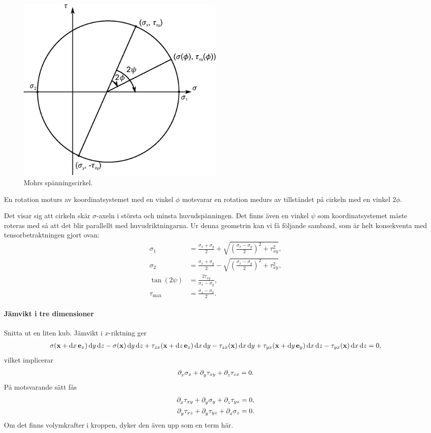 \begin{figure}[!ht]
	\centering
	\includegraphics[width = 0.5\textwidth]{./Images/mohr_stress_circle.eps}
	\caption{Mohrs spänningscirkel.}
	\label{fig:mohr_stress_circle}
\end{figure}

En rotation moturs av koordinatsystemet med en vinkel $\phi$ motsvarar en rotation medurs av tillståndet på cirkeln med en vinkel $2\phi$.

Det visar sig att cirkeln skär $\sigma$-axeln i största och minsta huvudspänningen. Det finns även en vinkel $\psi$ som koordinatsystemet måste roteras med så att det blir parallellt med huvudriktningarna. Ur denna geometrin kan vi få följande samband, som är helt konsekventa med tensorbetraktningen gjort ovan:
\begin{align*}
	\sigma_{1}        &= \frac{\sigma_{x} + \sigma_{y}}{2} + \sqrt{\left(\frac{\sigma_{x} - \sigma_{y}}{2}\right)^{2} + \tau_{xy}^{2}}, \\
	\sigma_{2}        &= \frac{\sigma_{x} + \sigma_{y}}{2} - \sqrt{\left(\frac{\sigma_{x} - \sigma_{y}}{2}\right)^{2} + \tau_{xy}^{2}}, \\
	\tan(2\psi)       &= \frac{2\tau_{xy}}{\sigma_{x} - \sigma_{y}}, \\
	\tau_{\text{max}} &= \frac{\sigma_{1} - \sigma_{3}}{2}.
\end{align*}

\paragraph{Jämvikt i tre dimensioner}
Snitta ut en liten kub. Jämvikt i $x$-riktning ger
\begin{align*}
	\sigma(\vb{x} + \dd{x}\vb{e}_{x})\dd{y}\dd{z} - \sigma(\vb{x})\dd{y}\dd{z} + \tau_{zx}(\vb{x} + \dd{z}\vb{e}_{z})\dd{x}\dd{y} - \tau_{zx}(\vb{x})\dd{x}\dd{y} + \tau_{yx}(\vb{x} + \dd{y}\vb{e}_{y})\dd{x}\dd{z} - \tau_{yx}(\vb{x})\dd{x}\dd{z} = 0,
\end{align*}
vilket implicerar
\begin{align*}
	\partial_{x}^{}\sigma_{x} + \partial_{y}^{}\tau_{xy} + \partial_{z}^{}\tau_{zx} = 0.
\end{align*}
På motsvarande sätt fås
\begin{align*}
	\partial_{x}^{}\tau_{xy} + \partial_{y}^{}\sigma_{y} + \partial_{z}^{}\tau_{yz} &= 0, \\
	\partial_{y}^{}\tau_{xz} + \partial_{y}^{}\tau_{yz} + \partial_{z}^{}\sigma_{z} &= 0.
\end{align*}
Om det finns volymkrafter i kroppen, dyker den även upp som en term här.


